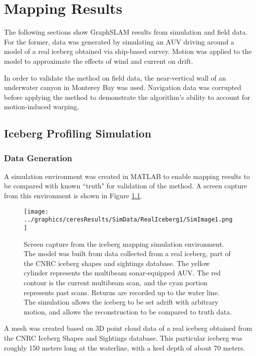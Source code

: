 
\chapter{Mapping Results}
\label{ch.Results}

The following sections show GraphSLAM results from simulation and field data. For the former, data was generated by simulating an AUV driving around a model of a real iceberg obtained via ship-based survey. Motion was applied to the model to approximate the effects of wind and current on drift.

In order to validate the method on field data, the near-vertical wall of an underwater canyon in Monterey Bay was used. Navigation data was corrupted before applying the method to demonstrate the algorithm's ability to account for motion-induced warping.

\section{Iceberg Profiling Simulation}

\subsection{Data Generation}

A simulation environment was created in MATLAB to enable mapping results to be compared with known ``truth" for validation of the method. A screen capture from this environment is shown in Figure \ref{fig:IcebergSim}.
 
 \begin{figure}[!htb]
   \centering
   \texttt{[image: ../graphics/ceresResults/SimData/RealIceberg1/SimImage1.png]} %
   \caption{Screen capture from the iceberg mapping simulation environment. The model was built from data collected from a real iceberg, part of the CNRC iceberg shapes and sightings database. The yellow cylinder represents the multibeam sonar-equipped AUV. The red contour is the current multibeam scan, and the cyan portion represents past scans. Returns are recorded up to the water line. The simulation allows the iceberg to be set adrift with arbitrary motion, and allows the reconstruction to be compared to truth data.}
   \label{fig:IcebergSim}
\end{figure}

A mesh was created based on 3D point cloud data of a real iceberg obtained from the CNRC Iceberg Shapes and Sightings database. \cite{Verbit2006} This particular iceberg was roughly 150 meters long at the waterline, with a keel depth of about 70 meters.

